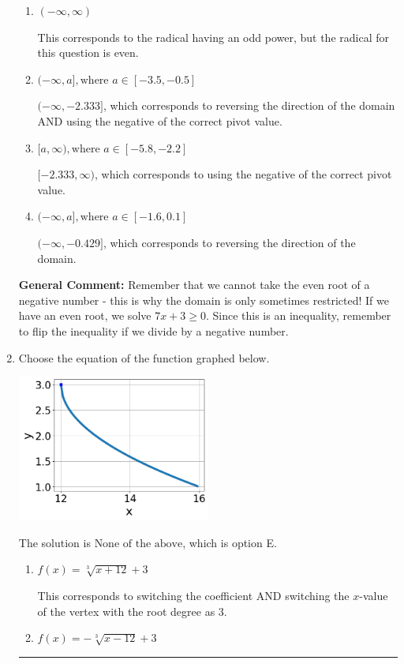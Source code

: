 \documentclass{extbook}[14pt]
\newcommand{\litem}[1]{\item #1

\rule{\textwidth}{0.4pt}}
\begin{document}
\begin{enumerate}
{\begin{enumerate}[label=\Alph*.]
* $[-0.429, \infty)$, which is the correct option.
\item \( (-\infty, \infty) \)

This corresponds to the radical having an odd power, but the radical for this question is even.
\item \( (-\infty, a], \text{where } a \in [-3.5, -0.5] \)

$(-\infty, -2.333]$, which corresponds to reversing the direction of the domain AND using the negative of the correct pivot value.
\item \( [a, \infty), \text{where } a \in [-5.8, -2.2] \)

$[-2.333, \infty)$, which corresponds to using the negative of the correct pivot value.
\item \( (-\infty, a], \text{where } a \in [-1.6, 0.1] \)

 $(-\infty, -0.429]$, which corresponds to reversing the direction of the domain.
\end{enumerate}

\textbf{General Comment:} Remember that we cannot take the even root of a negative number - this is why the domain is only sometimes restricted! If we have an even root, we solve $7 x + 3 \geq 0$. Since this is an inequality, remember to flip the inequality if we divide by a negative number.
}
\litem{
Choose the equation of the function graphed below.

\begin{center}
    \includegraphics[width=0.5\textwidth]{../Figures/radicalGraphToEquationB.png}
\end{center}


The solution is \( \text{None of the above} \), which is option E.\begin{enumerate}[label=\Alph*.]
\item \( f(x) = \sqrt[3]{x + 12} + 3 \)

This corresponds to switching the coefficient AND switching the $x$-value of the vertex with the root degree as $3$.
\item \( f(x) = - \sqrt[3]{x - 12} + 3 \)


\end{enumerate}}
\end{enumerate}
\end{document}
